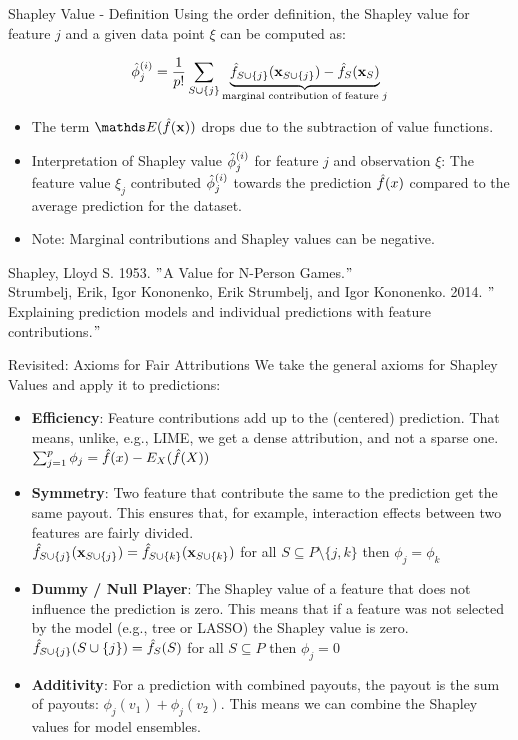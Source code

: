 \documentclass[11pt,compress,t,notes=noshow, xcolor=table]{beamer}
\begin{document}
\begin{vbframe}{Shapley Value - Definition}
  Using the order definition, the Shapley value for feature $j$ and a given data point $\xi$ can be computed as:

     $$ \phiij  = \frac{1}{p!} \sum_{\Scupj} \underbrace{\fh_{\Scupj}(\xv_{\Scupj}) - \fh_{S}(\xv_{S})}_{\text{marginal contribution of feature $j$}} $$
\begin{itemize}
    \item The term $\E(\fh(\xv))$ drops due to the subtraction of value functions.
  \item Interpretation of Shapley value $\phiij$ for feature $j$ and observation $\xi$:
  The feature value $\xi_{j}$ contributed $\phiij$ towards the prediction $\fh(x)$ compared to the average prediction for the dataset.
   \item Note: Marginal contributions and Shapley values can be negative.
\end{itemize}
\lz
\tiny
Shapley, Lloyd S. 1953. $"$A Value for N-Person Games.$"$\\
\vspace{0.2cm}
Strumbelj, Erik, Igor Kononenko, Erik Strumbelj, and Igor Kononenko. 2014. $"$Explaining prediction models and individual predictions with feature contributions.$"$

\end{vbframe}



\begin{vbframe}{Revisited: Axioms for Fair Attributions}
  We take the general axioms for Shapley Values and apply it to predictions:
  \begin{itemize}
    \item \textbf{Efficiency}: Feature contributions add up to the (centered) prediction. That means, unlike, e.g., LIME, we get a dense attribution, and not a sparse one.
      $\sum\nolimits_{j=1}^p\phi_j=\hat{f}(x)-E_X(\fh(X))$
    \item \textbf{Symmetry}: Two feature that contribute the same to the prediction get the same payout. This ensures that, for example, interaction effects between two features are fairly divided. \\
      $\fh_{S\cup\{j\}}(\xv_{\Scupj}) = \fh_{\Scupk}(\xv_{\Scupk})$ for all $S \subseteq P\setminus\{j,k\}$ then $\phi_j=\phi_k$
    \item \textbf{Dummy / Null Player}: The Shapley value of a feature that does not influence the prediction is zero. This means that if a feature was not selected by the model (e.g., tree or LASSO) the Shapley value is zero.  \\
      $\fh_{\Scupj}(\Scupj)=\fhS(S)$ for all $S \subseteq P$ then $\phi_j=0$
    \item \textbf{Additivity}:  For a prediction with combined payouts, the
      payout is the sum of payouts: $\phi_j(v_1) + \phi_j(v_2)$. This means we can combine the Shapley values for model ensembles.
  \end{itemize}
\end{vbframe}
\end{document}
